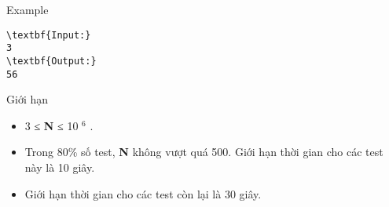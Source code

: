 Example
\begin{verbatim}
\textbf{Input:}
3
\textbf{Output:}
56\end{verbatim}
Giới hạn
\begin{itemize}
	\item 3 ≤ \textbf{ N } ≤ 10 $^ 6 $ .
	\item Trong 80\% số test, \textbf{ N } không vượt quá 500. Giới hạn thời gian cho các test này là 10 giây.
	\item Giới hạn thời gian cho các test còn lại là 30 giây.
\end{itemize}